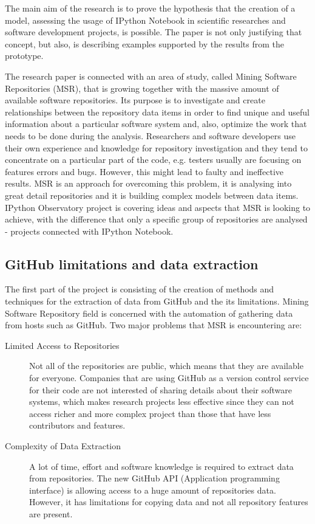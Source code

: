 The main aim of the research is to prove the hypothesis that the creation of a model, assessing the usage of IPython Notebook in scientific researches and software development projects, is possible. The paper is not only justifying that concept, but also, is describing examples supported by the results from the prototype. 

The research paper is connected with an area of study, called Mining Software Repositories (MSR)\cite{MSR2016}, that is growing together with the massive amount of available software repositories. Its purpose is to investigate and create relationships between the repository data items in order to find unique and useful information about a particular software system and, also, optimize the work that needs to be done during the analysis. Researchers and software developers use their own experience and knowledge for repository investigation and they tend to concentrate on a particular part of the code, e.g. testers usually are focusing on features errors and bugs. However, this might lead to faulty and ineffective results. MSR is an approach for overcoming this problem, it is analysing into great detail repositories and it is building complex models between data items\cite{hassan2008road}. IPython Observatory project is covering ideas and aspects that MSR is looking to achieve, with the difference that only a specific group of repositories are analysed - projects connected with IPython Notebook.

\subsection{GitHub limitations and data extraction}
\label{subsec:limitations}
The first part of the project is consisting of the creation of methods and techniques for the extraction of data from GitHub\cite{gitHubWiki} and the its limitations. Mining Software Repository field is concerned with the automation of gathering data from hosts such as GitHub. Two major problems that MSR is encountering are\cite{hassan2008road}:

\vspace{1em}
\begin{description}
    \item[Limited Access to Repositories]  Not all of the repositories are public, which means that they are available for everyone. Companies that are using GitHub as a version control service for their code are not interested of sharing details about their software systems, which makes research projects less effective since they can not access richer and more complex project than those that have less contributors and features\cite{hassan2008road}. 
    
    \item[Complexity of Data Extraction] A lot of time, effort and software knowledge is required to extract data from repositories. The new GitHub API (Application programming interface)\cite{GitAPI} is allowing access to a huge amount of repositories data. However, it has limitations for copying data and not all repository features are present. 
\end{description}
\vspace{1em}

